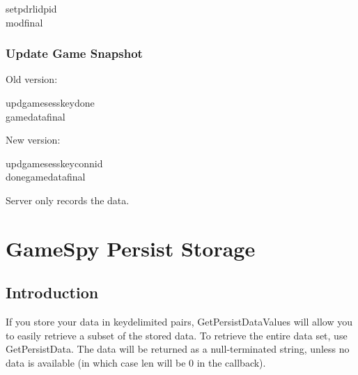\documentclass[oneside,titlepage,a4paper]{Definition/retrospy} %
\begin{document}
\ServerResponse

\begin{mybox}
	\tbs setpdr\tbs<success or fail>\tbs lid\tbs<local id>\tbs pid\tbs <profile id>\\\tbs mod\tbs <modified time>\tbs final\tbs
\end{mybox}

\section{Update Game Snapshot}
\ClientRequest

Old version:
\begin{mybox}
	\tbs updgame\tbs\tbs sesskey\tbs<session key>\tbs done\tbs<final flag>\\\tbs gamedata\tbs <game data>\tbs final\tbs
\end{mybox}

New version:
\begin{mybox}
		\tbs updgame\tbs\tbs sesskey\tbs<session key>\tbs connid\tbs<connection id>\\\tbs done\tbs<final flag>\tbs gamedata\tbs <game data>\tbs final\tbs
\end{mybox}

\ServerResponse

Server only records the data.


\part{GameSpy Persist Storage}
\chapter{Introduction}
If you store your data in key\value delimited pairs, GetPersistDataValues will
allow you to easily retrieve a subset of the stored data. To retrieve the entire
data set, use GetPersistData. The data will be returned as a null-terminated string,
unless no data is available (in which case len will be 0 in the callback).
\end{document}

